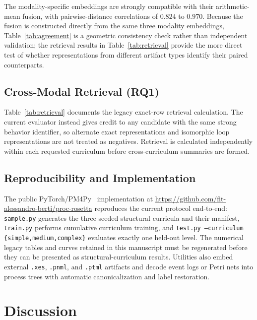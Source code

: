 \documentclass[manuscript,screen,nonacm]{acmart}
\begin{document}
The modality-specific embeddings are strongly compatible with their arithmetic-mean fusion, with pairwise-distance correlations of $0.824$ to $0.970$. Because the fusion is constructed directly from the same three modality embeddings, Table~\ref{tab:agreement} is a geometric consistency check rather than independent validation; the retrieval results in Table~\ref{tab:retrieval} provide the more direct test of whether representations from different artifact types identify their paired counterparts.

\subsection{Cross-Modal Retrieval (RQ1)}
\label{sec:retrievalresults}



Table~\ref{tab:retrieval} documents the legacy exact-row retrieval calculation. The current evaluator instead gives credit to any candidate with the same strong behavior identifier, so alternate exact representations and isomorphic loop representations are not treated as negatives. Retrieval is calculated independently within each requested curriculum before cross-curriculum summaries are formed.

\subsection{Reproducibility and Implementation}
\label{sec:repository}

The public PyTorch/PM4Py~\cite{Berti2023PM4Py} implementation at \url{https://github.com/fit-alessandro-berti/proc-rosetta} reproduces the current protocol end-to-end: \texttt{sample.py} generates the three seeded structural curricula and their manifest, \texttt{train.py} performs cumulative curriculum training, and \texttt{test.py --curriculum \{simple,medium,complex\}} evaluates exactly one held-out level. The numerical legacy tables and curves retained in this manuscript must be regenerated before they can be presented as structural-curriculum results. Utilities also embed external \texttt{.xes}, \texttt{.pnml}, and \texttt{.ptml} artifacts and decode event logs or Petri nets into process trees with automatic canonicalization and label restoration.

\section{Discussion}
\label{sec:discussion}
\end{document}

